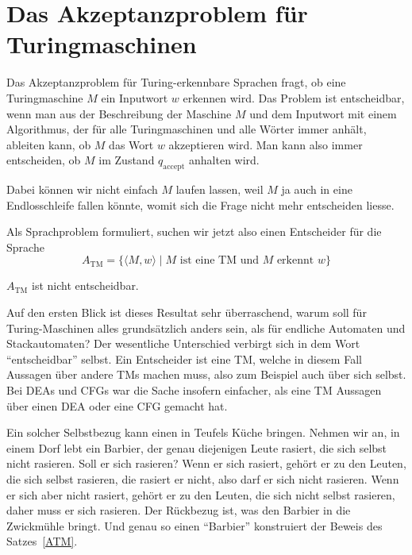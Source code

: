 %
%
%
\section{Das Akzeptanzproblem für Turingmaschinen}
%
Das Akzeptanzproblem für Turing-erkennbare Sprachen fragt, ob 
eine Turingmaschine $M$ ein Inputwort $w$ erkennen wird.
Das Problem ist entscheidbar, wenn man aus der Beschreibung
der Maschine $M$ und dem Inputwort mit einem Algorithmus, der
für alle Turingmaschinen und alle Wörter immer anhält, ableiten
kann, ob $M$ das Wort $w$ akzeptieren wird.
Man kann also immer
entscheiden, ob $M$ im Zustand $q_{\text{accept}}$ anhalten wird.

Dabei können wir nicht einfach $M$ laufen lassen, weil $M$
ja auch in eine Endlosschleife fallen könnte, womit sich die
Frage nicht mehr entscheiden liesse.

Als Sprachproblem formuliert, suchen wir jetzt also einen
Entscheider für die Sprache
\[
A_{\text{TM}}=\{
\langle M,w\rangle\;|\; \text{$M$ ist eine TM und $M$ erkennt $w$}
\}
\]
%

\begin{satz}
\label{ATM}
$A_{\text{TM}}$ ist nicht entscheidbar.
\end{satz}

Auf den ersten Blick ist dieses Resultat sehr überraschend, warum
soll für Turing-Maschinen alles grundsätzlich anders sein, als
für endliche Automaten und Stackautomaten? Der wesentliche Unterschied
verbirgt sich in dem Wort ``entscheidbar'' selbst.
Ein Entscheider ist eine
TM, welche in diesem Fall Aussagen über andere TMs machen muss, also
zum Beispiel auch über sich selbst.
Bei DEAs und CFGs war die Sache
insofern einfacher, als eine TM Aussagen über einen DEA oder eine
CFG gemacht hat.

Ein solcher Selbstbezug kann einen in Teufels Küche bringen.
Nehmen wir an, in einem Dorf lebt ein Barbier, der genau diejenigen
Leute rasiert, die sich selbst nicht rasieren.
Soll er sich rasieren?
Wenn er sich rasiert, gehört er zu den Leuten, die sich selbst rasieren,
die rasiert er nicht, also darf er sich nicht rasieren.
Wenn er sich
aber nicht rasiert, gehört er zu den Leuten, die sich nicht selbst
rasieren, daher muss er sich rasieren.
Der Rückbezug ist, was den
Barbier in die Zwickmühle bringt.
Und genau so einen ``Barbier''
konstruiert der Beweis des Satzes~\ref{ATM}.

